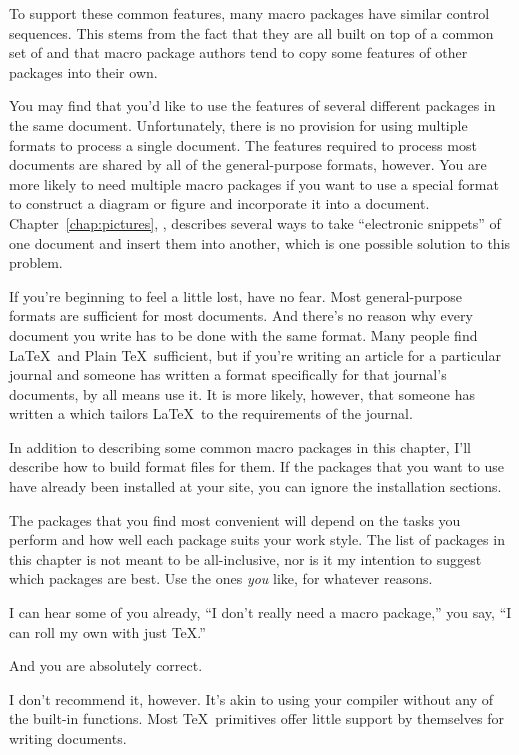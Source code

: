 To support these common features,
many macro packages have similar control sequences.  This stems from the 
fact that they are all built on top of a common set 
of   and
that macro package authors tend to copy some features of
other packages into their own.

You may find that you'd like to use the features of several
different packages in the same document.  Unfortunately, there is no
provision for using multiple formats to process a single document.
The features required to process most documents are shared by
all of the general-purpose formats, however.  You are more likely to need
multiple macro packages if you want to use a special format to
construct a diagram or figure and incorporate it
into a document.  Chapter~\ref{chap:pictures},
{\it {}\/}, describes several ways to take
``electronic snippets'' of one document and insert them into another,
which is one possible solution to this problem.

If you're beginning to feel a little lost,
have no fear.  Most general-purpose formats are
sufficient for most documents.  And there's no reason why every
document you write has to be done with the same format.  Many people
find \LaTeX\ and Plain \TeX\ sufficient, but if you're writing an
article for a particular journal and someone has written a format
specifically for that journal's documents, by all
means use it.  It is more likely, however, that someone has written a
 which 
tailors \LaTeX\ to the requirements of the
journal.

In addition to describing some common macro packages in this chapter, I'll
describe how to build format files for them.
If the packages that you want to use have already been
installed at your site, you can ignore the installation sections.

The packages that you find most convenient will
depend on the tasks you perform and how well each package suits your
work style.  The list of packages in this chapter is not meant to be
all-inclusive, nor is it my intention to suggest which packages are best.
Use the ones {\em you\/} like, for whatever reasons.

I can hear some of you already, ``I don't really need a macro package,'' you
say, ``I can roll my own with just \TeX.''  

And you are absolutely correct.

I don't recommend it, however.  It's akin to using your compiler without
any of the built-in functions.  Most \TeX\ primitives offer little
support by themselves for writing documents.

